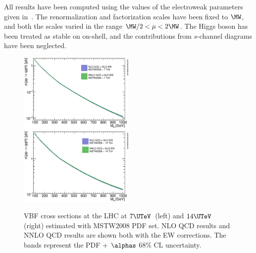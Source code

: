 All results have been computed using the values of the electroweak parameters
given in~. The renormalization and factorization scales have
been fixed to $\MW$, and both the scales varied in the range
$\MW/2<\mu<2\MW$. The Higgs boson has been treated as stable on on-shell, and
the contributions from $s$-channel diagrams have been neglected.

\begin{figure}
  \includegraphics[width=0.5\textwidth]{YRHXS_VBF/YRHXS_VBF_fig1.eps}
  \includegraphics[width=0.5\textwidth]{YRHXS_VBF/YRHXS_VBF_fig2.eps}
  \caption{VBF cross sections at the LHC at $7\UTeV$~(left) and $14\UTeV$ (right)
    estimated with MSTW2008 PDF set.  NLO QCD results and NNLO QCD
results are shown both with the
    EW corrections. The bands represent the
    PDF + $\alphas$ 68\% CL uncertainty.}
  \label{fig:totXsecMSTW2008}
\end{figure}


